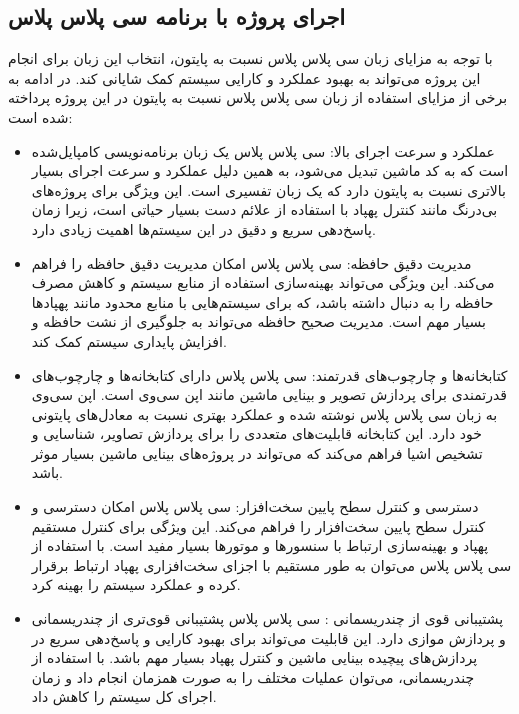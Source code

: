\subsection{اجرای پروژه با برنامه سی پلاس پلاس}
با توجه به مزایای زبان سی پلاس پلاس نسبت به پایتون، انتخاب این زبان برای انجام این پروژه می‌تواند به بهبود عملکرد و کارایی سیستم کمک شایانی کند. در ادامه به برخی از مزایای استفاده از زبان سی پلاس پلاس نسبت به پایتون در این پروژه پرداخته شده است:

\begin{itemize}
    \item عملکرد و سرعت اجرای بالا: سی پلاس پلاس یک زبان برنامه‌نویسی کامپایل‌شده است که به کد ماشین تبدیل می‌شود، به همین دلیل عملکرد و سرعت اجرای بسیار بالاتری نسبت به پایتون دارد که یک زبان تفسیری است. این ویژگی
    برای پروژه‌های بی‌درنگ مانند کنترل پهپاد با استفاده از علائم دست بسیار حیاتی است، زیرا زمان پاسخ‌دهی سریع و دقیق در این سیستم‌ها اهمیت زیادی دارد.
    \item مدیریت دقیق حافظه: سی پلاس پلاس امکان مدیریت دقیق حافظه را فراهم می‌کند. این ویژگی می‌تواند بهینه‌سازی استفاده از منابع سیستم و کاهش مصرف حافظه را به دنبال داشته باشد، که برای سیستم‌هایی 
    با منابع محدود مانند پهپادها بسیار مهم است. مدیریت صحیح حافظه می‌تواند به جلوگیری از نشت حافظه و افزایش پایداری سیستم کمک کند.
    \item کتابخانه‌ها و چارچوب‌های قدرتمند: سی پلاس پلاس دارای کتابخانه‌ها و چارچوب‌های قدرتمندی برای پردازش تصویر و بینایی ماشین مانند اپن سی‌وی است. اپن سی‌وی به زبان سی پلاس پلاس نوشته شده
    و عملکرد بهتری نسبت به معادل‌های پایتونی خود دارد. این کتابخانه قابلیت‌های متعددی را برای پردازش تصاویر، شناسایی و تشخیص اشیا فراهم می‌کند که می‌تواند در پروژه‌های بینایی ماشین بسیار موثر باشد.
    \item دسترسی و کنترل سطح پایین سخت‌افزار: سی پلاس پلاس امکان دسترسی و کنترل سطح پایین سخت‌افزار را فراهم می‌کند. این ویژگی برای کنترل مستقیم پهپاد و بهینه‌سازی ارتباط با سنسورها 
    و موتورها بسیار مفید است. با استفاده از سی پلاس پلاس می‌توان به طور مستقیم با اجزای سخت‌افزاری پهپاد ارتباط برقرار کرده و عملکرد سیستم را بهینه کرد.
    \item  پشتیبانی قوی از چندریسمانی : سی پلاس پلاس پشتیبانی قوی‌تری از چندریسمانی و پردازش موازی دارد. این قابلیت می‌تواند برای بهبود کارایی و پاسخ‌دهی سریع در پردازش‌های پیچیده بینایی ماشین 
    و کنترل پهپاد بسیار مهم باشد. با استفاده از چندریسمانی، می‌توان عملیات مختلف را به صورت همزمان انجام داد و زمان اجرای کل سیستم را کاهش داد.
\end{itemize}

